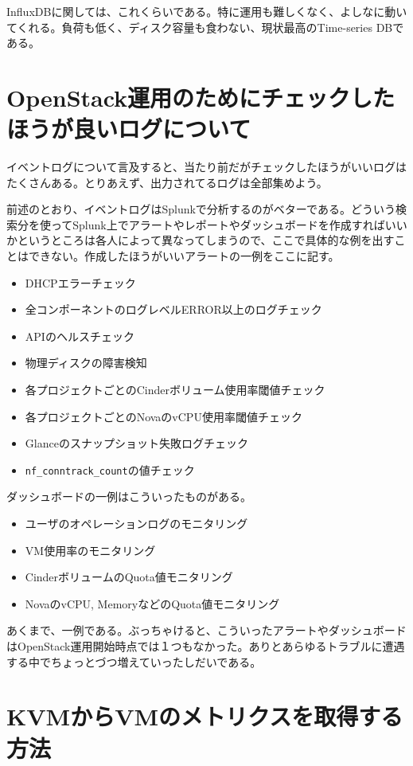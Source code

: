 InfluxDBに関しては、これくらいである。特に運用も難しくなく、よしなに動いてくれる。負荷も低く、ディスク容量も食わない、現状最高のTime-series DBである。

\section{OpenStack運用のためにチェックしたほうが良いログについて}
イベントログについて言及すると、当たり前だがチェックしたほうがいいログはたくさんある。とりあえず、出力されてるログは全部集めよう。

前述のとおり、イベントログはSplunkで分析するのがベターである。どういう検索分を使ってSplunk上でアラートやレポートやダッシュボードを作成すればいいかというところは各人によって異なってしまうので、ここで具体的な例を出すことはできない。作成したほうがいいアラートの一例をここに記す。

\begin{itemize}
	\item DHCPエラーチェック
	\item 全コンポーネントのログレベルERROR以上のログチェック
	\item APIのヘルスチェック
	\item 物理ディスクの障害検知
	\item 各プロジェクトごとのCinderボリューム使用率閾値チェック
	\item 各プロジェクトごとのNovaのvCPU使用率閾値チェック
	\item Glanceのスナップショット失敗ログチェック
	\item \verb|nf_conntrack_count|の値チェック
\end{itemize}

ダッシュボードの一例はこういったものがある。

\begin{itemize}
	\item ユーザのオペレーションログのモニタリング
	\item VM使用率のモニタリング
	\item CinderボリュームのQuota値モニタリング
	\item NovaのvCPU, MemoryなどのQuota値モニタリング
\end{itemize}

あくまで、一例である。ぶっちゃけると、こういったアラートやダッシュボードはOpenStack運用開始時点では１つもなかった。ありとあらゆるトラブルに遭遇する中でちょっとづつ増えていったしだいである。

\section{KVMからVMのメトリクスを取得する方法}
